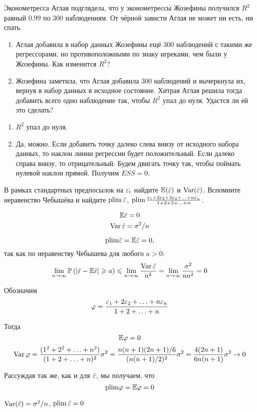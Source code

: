 \begin{problem}
Эконометресса Аглая подглядела, что у эконометрессы Жозефины получился $R^2$ равный $0.99$ по 300 наблюдениям. От чёрной зависти Аглая не может ни есть, ни спать.

\begin{enumerate}
\item Аглая добавила в набор данных Жозефины ещё 300 наблюдений с такими же регрессорами, но противоположными по знаку игреками, чем были у Жозефины. Как изменится $R^2$?
\item Жозефина заметила, что Аглая добавила 300 наблюдений и вычеркнула их, вернув в набор данных в исходное состояние. Хитрая Аглая решила тогда добавить всего одно наблюдение так, чтобы $R^2$ упал до нуля. Удастся ли ей это сделать?
\end{enumerate}


\begin{sol}
\begin{enumerate}
\item $R^2$ упал до нуля.
\item Да, можно. Если добавить точку далеко слева внизу от исходного набора данных, то наклон линии регрессии будет положительный. Если далеко справа внизу, то отрицательный. Будем двигать точку так, чтобы поймать нулевой наклон прямой. Получим $ESS=0$.
\end{enumerate}
\end{sol}
\end{problem}



\begin{problem}
В рамках стандартных предпосылок на $\varepsilon_i$ найдите $\mathbb{E}(\bar{\varepsilon})$ и $\operatorname{Var}(\bar{\varepsilon})$. Вспомните неравенство Чебышёва и найдите $\operatorname*{plim} \bar{\varepsilon}$, $\operatorname*{plim} \frac{\varepsilon_1+2\varepsilon_2+3\varepsilon_3 + \ldots + n\varepsilon_n}{1+2+3+\ldots+n}$.


\begin{sol}
\[ \mathbb{E} \bar{\varepsilon} = 0\]
\[ \operatorname{Var} \bar{\varepsilon} = \sigma^2 / n\]

\[ \text{plim} \bar{\varepsilon} = \mathbb{E} \bar{\varepsilon} = 0, \]
так как по неравенству Чебышева для любого \(a > 0\):
\[ \lim_{n \rightarrow \infty} \mathbb{P} \left(|\bar{\varepsilon} -\mathbb{E} \bar{\varepsilon}| \geqslant a  \right) \leqslant \lim_{n \rightarrow \infty} \frac{\operatorname{Var} \bar{\varepsilon}}{a^2} = \lim_{n \rightarrow \infty} \frac{\sigma^2}{na^2} = 0 \]

Обозначим
\[\varphi = \frac{\varepsilon_1 + 2\varepsilon_2 + \ldots + n\varepsilon_n}{1 + 2 + \ldots + n} \]

Тогда
\[\mathbb{E} \varphi = 0  \]
\[\operatorname{Var} \varphi = \frac{(1^2 + 2^2 + \ldots + n^2)}{(1 + 2 + \ldots + n)^2} \sigma^2   = \frac{n(n+1)(2n+1)/6}{(n(n+1)/2)^2} \sigma^2 = \frac{4(2n+1)}{6n(n+1)} \sigma^2 \rightarrow 0\]

Рассуждая так же, как и для \(\bar{\varepsilon}\), мы получаем, что
\[ \text{plim} \varphi = \mathbb{E} \varphi = 0 \]

$\operatorname{Var}(\bar{\varepsilon})=\sigma^2/n$,  $\operatorname*{plim} \bar{\varepsilon}=0$
\end{sol}
\end{problem}


